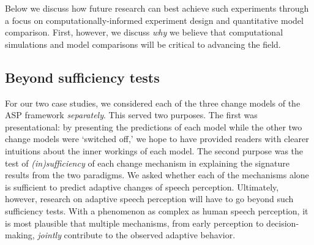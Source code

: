 \documentclass[
  11pt,
  english,
  man,floatsintext]{apa6}
\begin{document}
Below we discuss how future research can best achieve such experiments through a focus on computationally-informed experiment design and quantitative model comparison. First, however, we discuss \emph{why} we believe that computational simulations and model comparisons will be critical to advancing the field.

\hypertarget{beyond-sufficiency-tests}{%
\subsection{Beyond sufficiency tests}\label{beyond-sufficiency-tests}}

For our two case studies, we considered each of the three change models of the ASP framework \emph{separately}. This served two purposes. The first was presentational: by presenting the predictions of each model while the other two change models were `switched off,' we hope to have provided readers with clearer intuitions about the inner workings of each model. The second purpose was the test of \emph{(in)sufficiency} of each change mechanism in explaining the signature results from the two paradigms. We asked whether each of the mechanisms alone is sufficient to predict adaptive changes of speech perception. Ultimately, however, research on adaptive speech perception will have to go beyond such sufficiency tests. With a phenomenon as complex as human speech perception, it is most plausible that multiple mechanisms, from early perception to decision-making, \emph{jointly} contribute to the observed adaptive behavior.
\end{document}
